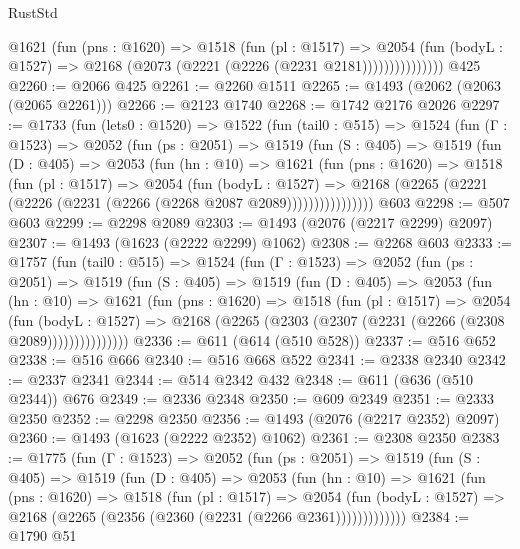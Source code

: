 \begin{lexlean}{RustStd}
\begin{coremodule}
                  @1621
                    (fun (pns : @1620) =>
                    @1518
                      (fun (pl : @1517) =>
                      @2054
                        (fun (bodyL : @1527) =>
                        @2168 (@2073 (@2221 (@2226 (@2231 @2181)))))))))))))))
    @425
@2260 := @2066 @425
@2261 := @2260 @1511
@2265 := @1493 (@2062 (@2063 (@2065 @2261)))
@2266 := @2123 @1740
@2268 := @1742 @2176 @2026
@2297 := @1733
    (fun (lets0 : @1520) =>
    @1522
      (fun (tail0 : @515) =>
      @1524
        (fun (Γ : @1523) =>
        @2052
          (fun (ps : @2051) =>
          @1519
            (fun (S : @405) =>
            @1519
              (fun (D : @405) =>
              @2053
                (fun (hn : @10) =>
                @1621
                  (fun (pns : @1620) =>
                  @1518
                    (fun (pl : @1517) =>
                    @2054
                      (fun (bodyL : @1527) =>
                      @2168 (@2265 (@2221 (@2226 (@2231 (@2266 (@2268 @2087 @2089))))))))))))))))
    @603
@2298 := @507 @603
@2299 := @2298 @2089
@2303 := @1493 (@2076 (@2217 @2299) @2097)
@2307 := @1493 (@1623 (@2222 @2299) @1062)
@2308 := @2268 @603
@2333 := @1757
    (fun (tail0 : @515) =>
    @1524
      (fun (Γ : @1523) =>
      @2052
        (fun (ps : @2051) =>
        @1519
          (fun (S : @405) =>
          @1519
            (fun (D : @405) =>
            @2053
              (fun (hn : @10) =>
              @1621
                (fun (pns : @1620) =>
                @1518
                  (fun (pl : @1517) =>
                  @2054
                    (fun (bodyL : @1527) =>
                    @2168 (@2265 (@2303 (@2307 (@2231 (@2266 (@2308 @2089)))))))))))))))
@2336 := @611 (@614 (@510 @528))
@2337 := @516 @652
@2338 := @516 @666
@2340 := @516 @668 @522
@2341 := @2338 @2340
@2342 := @2337 @2341
@2344 := @514 @2342 @432
@2348 := @611 (@636 (@510 @2344)) @676
@2349 := @2336 @2348
@2350 := @609 @2349
@2351 := @2333 @2350
@2352 := @2298 @2350
@2356 := @1493 (@2076 (@2217 @2352) @2097)
@2360 := @1493 (@1623 (@2222 @2352) @1062)
@2361 := @2308 @2350
@2383 := @1775
    (fun (Γ : @1523) =>
    @2052
      (fun (ps : @2051) =>
      @1519
        (fun (S : @405) =>
        @1519
          (fun (D : @405) =>
          @2053
            (fun (hn : @10) =>
            @1621
              (fun (pns : @1620) =>
              @1518
                (fun (pl : @1517) =>
                @2054
                  (fun (bodyL : @1527) =>
                  @2168 (@2265 (@2356 (@2360 (@2231 (@2266 @2361)))))))))))))
@2384 := @1790 @51

\end{coremodule}
\end{lexlean}
